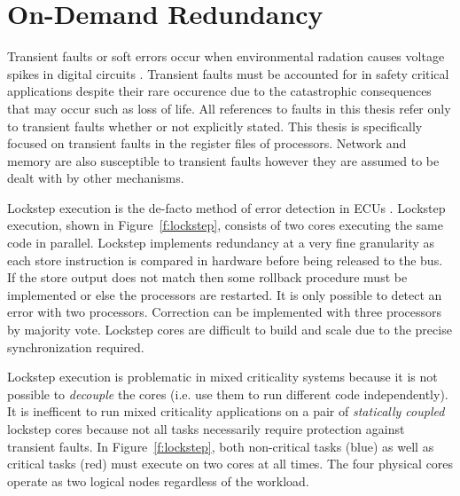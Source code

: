 

\section{On-Demand Redundancy}
\label{s:odr}

	Transient faults or soft errors occur when environmental radation causes voltage spikes in digital circuits \cite{Baumann:05}. 
	Transient faults must be accounted for in safety critical applications despite their rare occurence due to the catastrophic consequences that may occur such as loss of life.
	All references to faults in this thesis refer only to transient faults whether or not explicitly stated. 
	This thesis is specifically focused on transient faults in the register files of processors. 
	Network \cite{radetzki2013methods} and memory \cite{Baumann:05} are also susceptible to transient faults however they are assumed to be dealt with by other mechanisms.


	Lockstep execution \cite{baleani2003fault} is the de-facto method of error detection in ECUs \cite{infineon2014aurix,freescale2014qorivva,renesas2016lockstep}. Lockstep execution, shown in Figure~\ref{f:lockstep}, consists of two cores executing the same code in parallel. 
	Lockstep implements redundancy at a very fine granularity as each store instruction is compared in hardware before being released to the bus. 
	If the store output does not match then some rollback procedure must be implemented or else the processors are restarted. 
	It is only possible to detect an error with two processors. 
	Correction can be implemented with three processors by majority vote. 
	Lockstep cores are difficult to build and scale due to the precise synchronization required.

	Lockstep execution is problematic in mixed criticality systems because it is not possible to \emph{decouple} the cores (i.e. use them to run different code independently). 
	It is inefficent to run mixed criticality applications on a pair of \emph{statically coupled} lockstep cores because not all tasks necessarily require protection against transient faults. 
	In Figure~\ref{f:lockstep}, both non-critical tasks (blue) as well as critical tasks (red) must execute on two cores at all times. 	
	The four physical cores operate as two logical nodes regardless of the workload.

